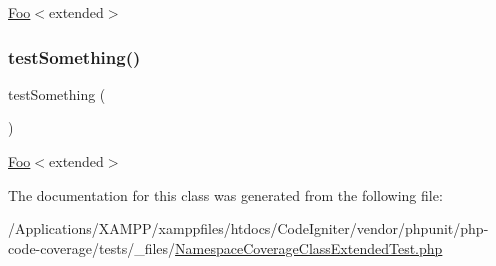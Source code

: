 \mbox{\hyperlink{class_foo}{Foo}}$<$extended$>$ \mbox{\label{class_namespace_coverage_class_extended_test_a0fc4e17369bc9607ebdd850d9eda8167}} 
\subsubsection{\texorpdfstring{test\+Something()}{testSomething()}\hspace{0.1cm}{\footnotesize\ttfamily [2/2]}}
{\footnotesize\ttfamily test\+Something (\begin{DoxyParamCaption}{ }\end{DoxyParamCaption})}

\mbox{\hyperlink{class_foo}{Foo}}$<$extended$>$ 

The documentation for this class was generated from the following file\+:\begin{DoxyCompactItemize}
\item 
/\+Applications/\+X\+A\+M\+P\+P/xamppfiles/htdocs/\+Code\+Igniter/vendor/phpunit/php-\/code-\/coverage/tests/\+\_\+files/\mbox{\hyperlink{php-code-coverage_2tests_2__files_2_namespace_coverage_class_extended_test_8php}{Namespace\+Coverage\+Class\+Extended\+Test.\+php}}\end{DoxyCompactItemize}
